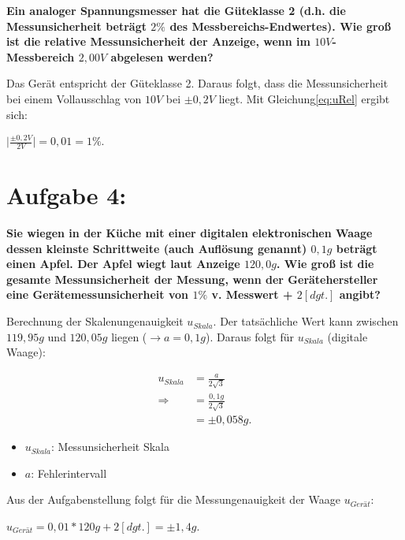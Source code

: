 \documentclass[
]{article}
\begin{document}
\textbf{Ein analoger Spannungsmesser hat die Güteklasse 2 (d.h. die
Messunsicherheit beträgt \(2 \%\) des Messbereichs-Endwertes). Wie groß
ist die relative Messunsicherheit der Anzeige, wenn im
\(10 V\)-Messbereich \(2,00 V\) abgelesen werden?}

Das Gerät entspricht der Güteklasse 2. Daraus folgt, dass die
Messunsicherheit bei einem Vollausschlag von \(10 V\) bei \(\pm0,2 V\)
liegt. Mit Gleichung\ref{eq:uRel} ergibt sich:

\begin{center}
$\vert\frac{\pm 0,2V}{2V}\vert = 0,01 = 1\%$.
\end{center}

\hypertarget{aufgabe-4}{%
\section{Aufgabe 4:}\label{aufgabe-4}}

\textbf{Sie wiegen in der Küche mit einer digitalen elektronischen Waage
dessen kleinste Schrittweite (auch Auflösung genannt) \(0,1 g\) beträgt
einen Apfel. Der Apfel wiegt laut Anzeige \(120,0 g\). Wie groß ist die
gesamte Messunsicherheit der Messung, wenn der Gerätehersteller eine
Gerätemessunsicherheit von \(1\%\) v. Messwert + \(2 [dgt.]\) angibt?}

Berechnung der Skalenungenauigkeit \(u_{Skala}\). Der tatsächliche Wert
kann zwischen \(119,95g\) und \(120,05g\) liegen
(\(\rightarrow a=0,1g\)). Daraus folgt für \(u_{Skala}\) (digitale
Waage):

\begin{equation}\label{eq:uDigit}
  \begin{split}
    u_{Skala} &= \frac{a}{2\sqrt{3}}\\
    \Rightarrow &= \frac{0,1g}{2\sqrt{3}}\\
              &= \pm 0,058g.
  \end{split}
\end{equation}

\begin{itemize}
  \item $u_{Skala}$: Messunsicherheit Skala
  \item $a$: Fehlerintervall
\end{itemize}

Aus der Aufgabenstellung folgt für die Messungenauigkeit der Waage
\(u_{Gerät}\):

\begin{center}
  $u_{Gerät} = 0,01 * 120g + 2 [dgt.] = \pm 1,4g.$
\end{center}
\end{document}
